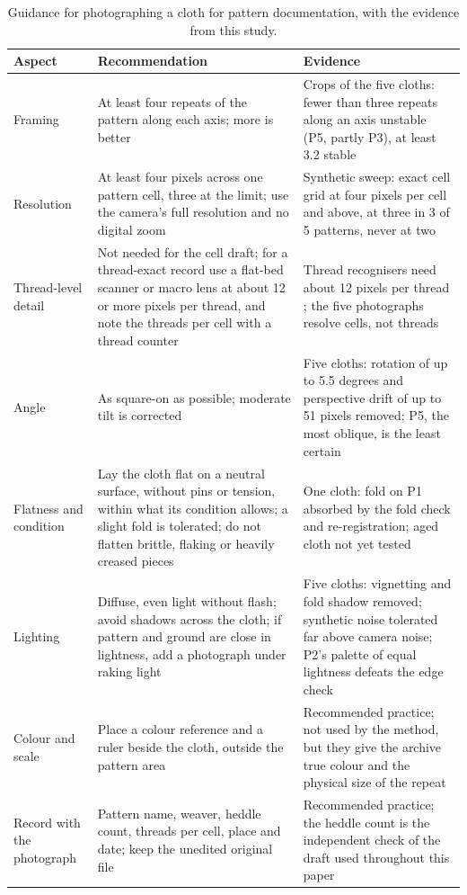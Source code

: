 \documentclass[12pt]{article}
\begin{document}
\begin{table}[htbp]
\caption{Guidance for photographing a cloth for pattern documentation, with the evidence from this study.}
\label{tab:capture}
\small
\renewcommand{\arraystretch}{1.1}
\begin{tabular}{L{2.6cm}L{6.0cm}L{5.9cm}}
Aspect & Recommendation & Evidence \\ \midrule
Framing & At least four repeats of the pattern along each axis; more is better & Crops of the five cloths: fewer than three repeats along an axis unstable (P5, partly P3), at least 3.2 stable \\
Resolution & At least four pixels across one pattern cell, three at the limit; use the camera's full resolution and no digital zoom & Synthetic sweep: exact cell grid at four pixels per cell and above, at three in 3 of 5 patterns, never at two \\
Thread-level detail & Not needed for the cell draft; for a thread-exact record use a flat-bed scanner or macro lens at about 12 or more pixels per thread, and note the threads per cell with a thread counter & Thread recognisers need about 12 pixels per thread \citep{meng2021}; the five photographs resolve cells, not threads \\
Angle & As square-on as possible; moderate tilt is corrected & Five cloths: rotation of up to 5.5 degrees and perspective drift of up to 51 pixels removed; P5, the most oblique, is the least certain \\
Flatness and condition & Lay the cloth flat on a neutral surface, without pins or tension, within what its condition allows; a slight fold is tolerated; do not flatten brittle, flaking or heavily creased pieces & One cloth: fold on P1 absorbed by the fold check and re-registration; aged cloth not yet tested \\
Lighting & Diffuse, even light without flash; avoid shadows across the cloth; if pattern and ground are close in lightness, add a photograph under raking light & Five cloths: vignetting and fold shadow removed; synthetic noise tolerated far above camera noise; P2's palette of equal lightness defeats the edge check \\
Colour and scale & Place a colour reference and a ruler beside the cloth, outside the pattern area & Recommended practice; not used by the method, but they give the archive true colour and the physical size of the repeat \\
Record with the photograph & Pattern name, weaver, heddle count, threads per cell, place and date; keep the unedited original file & Recommended practice; the heddle count is the independent check of the draft used throughout this paper \\
\end{tabular}
\end{table}
\end{document}
